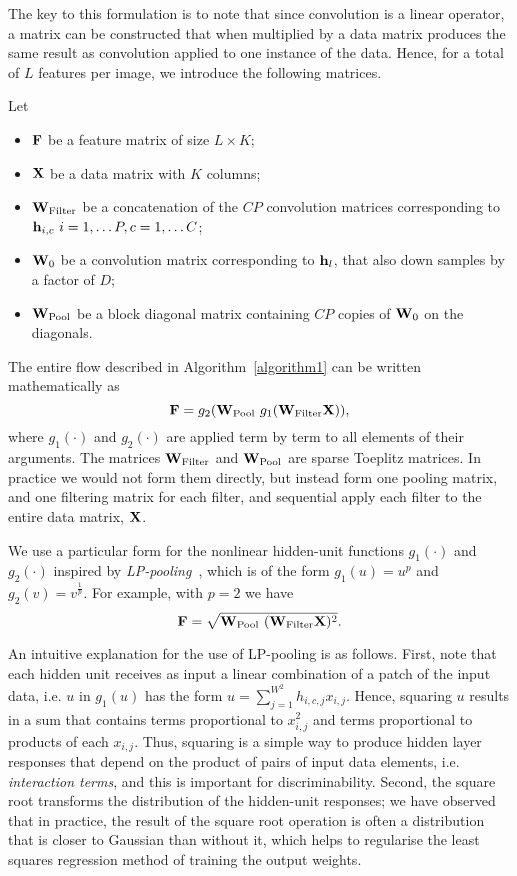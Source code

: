 \documentclass[conference]{IEEEtran}
\begin{document}
The key to this formulation is to note  that since convolution is a linear operator, a matrix can be constructed that when multiplied by a data matrix produces the same result as convolution applied to one instance of the data. Hence, for a total of $L$ features per image, we introduce the following matrices. 

Let 
\begin{itemize}
\item ${\bf F}$ be a feature matrix of size $L\times K$;
\item ${\bf X}$ be a data matrix with $K$ columns;
\item ${\bf W}_{\rm Filter}$ be a concatenation of the $CP$ convolution matrices corresponding to ${\bf h}_{i,c}~i=1,\dots P,c=1,\dots C$;
\item ${\bf W}_0$ be a convolution matrix corresponding to ${\bf h}_l$, that also down samples by a factor of $D$;
\item ${\bf W}_{\rm Pool}$ be a block diagonal matrix containing $CP$ copies of ${\bf W}_0$ on the diagonals.
\end{itemize}
The entire flow described in Algorithm~\ref{algorithm1} can  be written mathematically as
\begin{equation}
{\bf F} = g_2({\bf W}_{\rm Pool}~g_1({\bf W}_{\rm Filter}{\bf X})),
\end{equation}
where  $g_1(\cdot)$ and $g_2(\cdot)$ are applied term by term to all elements of their arguments. The matrices  ${\bf W}_{\rm Filter}$ and ${\bf W}_{\rm Pool}$ are sparse Toeplitz matrices. In practice we would not form them directly, but instead form one pooling matrix, and one filtering matrix for each filter, and sequential apply each filter to the entire data matrix, ${\bf X}$.

We use a particular  form for the nonlinear hidden-unit functions $g_1(\cdot)$ and $g_2(\cdot)$  inspired by {\em LP-pooling}~\cite{Sermanet.12}, which is of the form $g_1(u) = u^p$ and
$g_2(v) = v^{\frac{1}{p}}$. For example, with $p=2$ we have
\begin{equation}
{\bf F} = \sqrt{{\bf W}_{\rm Pool}~({\bf W}_{\rm Filter}{\bf X})^2}.
\end{equation}

An intuitive explanation for the use of LP-pooling is as follows. First, note that each hidden unit receives as input a linear combination of a patch of the input data, i.e. $u$ in $g_1(u)$ has the form $u=\sum_{j=1}^{W^2}h_{i,c,j}x_{i,j}$. Hence, squaring $u$ results in a sum that contains  terms proportional to $x_{i,j}^2$ and terms proportional to products of each $x_{i,j}$. Thus, squaring is a simple way to produce hidden layer responses that depend on the product of pairs of input data elements, i.e. {\em interaction terms}, and this is important for discriminability.  Second, the square root transforms the distribution of the hidden-unit responses; we have observed that in practice, the result of the square root operation is often a distribution that is closer to Gaussian than without it, which helps to regularise the least squares regression method of training the output weights.
\end{document}
